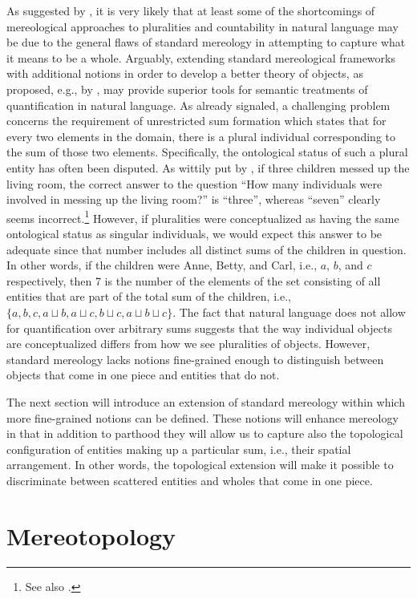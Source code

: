 As suggested by \citet{grimm2012number}, it is very likely that at least some of the shortcomings of mereological approaches to pluralities and countability in natural language may be due to the general flaws of standard mereology in attempting to capture what it means to be a whole. Arguably, extending standard mereological frameworks with additional notions in order to develop a better theory of objects, as proposed, e.g., by \citet{casati_varzi1999parts}, may provide superior tools for semantic treatments of quantification in natural language. As already signaled, a challenging problem concerns the requirement of unrestricted sum formation which states that for every two elements in the domain, there is a plural individual corresponding to the sum of those two elements. Specifically, the ontological status of such a plural entity has often been disputed. As wittily put by \citet{landman1989groupsi}, if three children messed up the living room, the correct answer to the question ``How many individuals were involved in messing up the living room?'' is ``three'', whereas ``seven'' clearly seems incorrect.\footnote{See also \citet{cresswell1985review}.} However, if pluralities were conceptualized as having the same ontological status as singular individuals, we would expect this answer to be adequate since that number includes all distinct sums of the children in question. In other words, if the children were Anne, Betty, and Carl, i.e., $a$, $b$, and $c$ respectively, then 7 is the number of the elements of the set consisting of all entities that are part of the total sum of the children, i.e., $\{a, b, c, a \sqcup b, a \sqcup c, b \sqcup c, a \sqcup b \sqcup c\}$. The fact that natural language does not allow for quantification over arbitrary sums suggests that the way individual objects are conceptualized differs from how we see pluralities of objects. However, standard mereology lacks notions fine-grained enough to distinguish between objects that come in one piece and entities that do not.

The next section will introduce an extension of standard mereology within which more fine-grained notions can be defined. These notions will enhance mereology in that in addition to parthood they will allow us to capture also the topological configuration of entities making up a particular sum, i.e., their spatial arrangement. In other words, the topological extension will make it possible to discriminate between scattered entities and wholes that come in one piece.

\section{Mereotopology}\label{sec:mereotopology}


